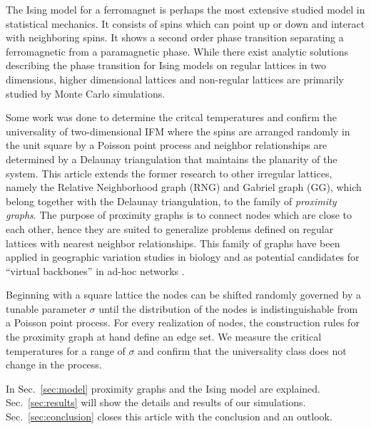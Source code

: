 The Ising model for a ferromagnet \cite{Ising1925} is perhaps the
most extensive studied model in statistical mechanics. It consists
of spins which can point up or down and interact with neighboring
spins. It shows a second order phase transition separating a
ferromagnetic from a paramagnetic phase. While there exist analytic
solutions\cite{Onsager1944,Wannier1945} describing the phase
transition for Ising models on regular lattices in two dimensions,
higher dimensional lattices and non-regular lattices are primarily studied
by Monte Carlo simulations.

Some work \cite{Janke1994,Lima2000,Lima2008} was done to determine
the critcal temperatures and confirm the universality of two-dimensional IFM
where the spins are arranged randomly in the unit square by a
Poisson point process and neighbor relationships are determined by a
Delaunay triangulation that maintains the planarity of the system.
This article extends the former research to other
irregular lattices, namely the Relative Neighborhood graph (RNG) and
Gabriel graph (GG), which belong together with the Delaunay triangulation,
to the family of \emph{proximity graphs}. The purpose of proximity graphs
is to connect nodes which are close to each other, hence they are suited
to generalize problems defined on regular lattices with nearest neighbor
relationships.
This family of graphs have been applied in geographic variation studies in
biology \cite{Sokal1978,Sokal1980,Selander1975} and as potential candidates for ``virtual backbones'' in ad-hoc
networks \cite{Kuhn2003,Bose2001,Santi2005,Karp2000,jennings2002topology}. %

Beginning with a square lattice the nodes can be shifted randomly governed
by a tunable parameter $\sigma$ until the distribution of the nodes is
indistinguishable from a Poisson point process.
For every realization of nodes, the construction rules for the proximity
graph at hand define an edge set.
We measure the critical temperatures for a range of $\sigma$ and confirm that
the universality class does not change in the process.


In Sec.~\ref{sec:model} proximity graphs and the Ising model
are explained. Sec.~\ref{sec:results} will show the
details and results of our simulations. Sec.~\ref{sec:conclusion}
closes this article with the conclusion and an outlook.
